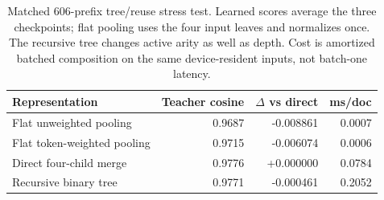 \begin{table}[H]
\caption{Matched 606-prefix tree/reuse stress test. Learned scores average the three checkpoints; flat pooling uses the four input leaves and normalizes once. The recursive tree changes active arity as well as depth. Cost is amortized batched composition on the same device-resident inputs, not batch-one latency.}
\label{tab:recursive-reuse}
\centering\small
\begin{tabularx}{\linewidth}{Yrrr}
\toprule
Representation & Teacher cosine & $\Delta$ vs direct & ms/doc \\
\midrule
Flat unweighted pooling & 0.9687 & -0.008861 & 0.0007 \\
Flat token-weighted pooling & 0.9715 & -0.006074 & 0.0006 \\
Direct four-child merge & 0.9776 & +0.000000 & 0.0784 \\
Recursive binary tree & 0.9771 & -0.000461 & 0.2052 \\
\bottomrule
\end{tabularx}
\end{table}
